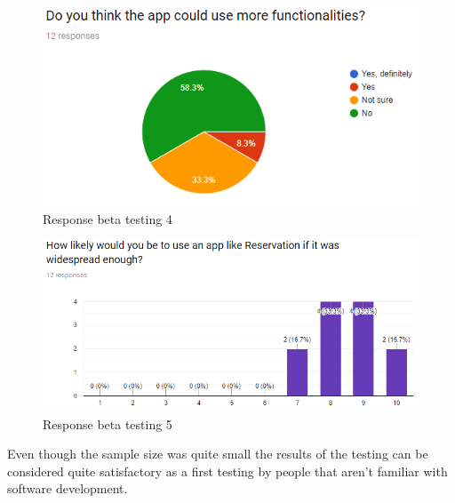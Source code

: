 \clearpage
\begin{figure}[h]
\centering
  \includegraphics[width=.75\textwidth, keepaspectratio=true]{Img/Beta4}
\caption{Response beta testing 4}
\end{figure}
\begin{figure}[h]
\centering
  \includegraphics[width=.75\textwidth, keepaspectratio=true]{Img/Beta5}
\caption{Response beta testing 5}
\end{figure}

\noindent Even though the sample size was quite small the results of the testing can be considered quite satisfactory as a first testing by people that aren't familiar with software development.